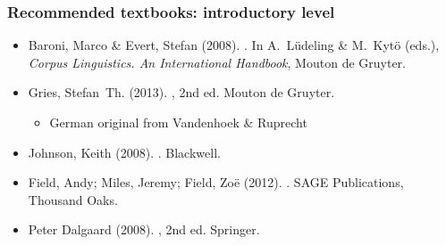 \documentclass[t]{beamer} %
\begin{document}
\begin{frame}
  \frametitle{Recommended textbooks: introductory level}

  \small
  \begin{itemize}
  \item Baroni, Marco \& Evert, Stefan (2008).  .  In A.~L{\"u}deling \& M.~Kyt{\"o}
    (eds.), {\em Corpus Linguistics. An International Handbook}, Mouton de Gruyter.
    \\[1ex]
  \item Gries, Stefan~Th. (2013). , 2nd ed. Mouton de Gruyter. %
    \secondary{[\texteuro 29]}
    \begin{itemize}
    \item German original from Vandenhoek \& Ruprecht \secondary{[\texteuro 25]}
    \\[1ex]
    \end{itemize}
  \item Johnson, Keith (2008). .
    Blackwell. \secondary{[\texteuro 38]}
    \\[1ex]
  \item Field, Andy; Miles, Jeremy; Field, Zo{\"e} (2012). .
    SAGE Publications, Thousand Oaks. \secondary{[\texteuro 61]}
    \\[1ex]
  \item Peter Dalgaard (2008). ,
     2nd ed. Springer. \secondary{[\texteuro 52]}
  \end{itemize}
\end{frame}
\end{document}
